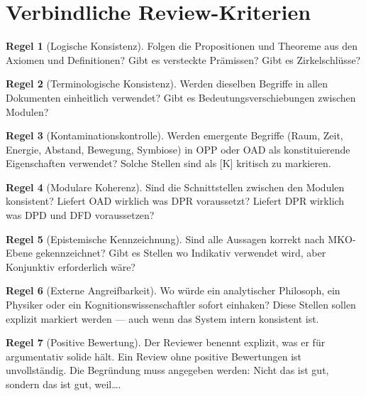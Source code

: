 \documentclass[11pt,a4paper]{article}
\theoremstyle{definition}
\newtheorem{regel}{Regel}[section]
\begin{document}
\section{Verbindliche Review-Kriterien}

\begin{regel}[Logische Konsistenz]
Folgen die Propositionen und Theoreme aus den Axiomen und Definitionen? Gibt es
versteckte Pr\"{a}missen? Gibt es Zirkelschl\"{u}sse?
\end{regel}

\begin{regel}[Terminologische Konsistenz]
Werden dieselben Begriffe in allen Dokumenten einheitlich verwendet? Gibt es
Bedeutungsverschiebungen zwischen Modulen?
\end{regel}

\begin{regel}[Kontaminationskontrolle]
Werden emergente Begriffe (Raum, Zeit, Energie, Abstand, Bewegung, Symbiose) in
OPP oder OAD als konstituierende Eigenschaften verwendet? Solche Stellen sind
als [K] kritisch zu markieren.
\end{regel}

\begin{regel}[Modulare Koherenz]
Sind die Schnittstellen zwischen den Modulen konsistent? Liefert OAD wirklich was
DPR voraussetzt? Liefert DPR wirklich was DPD und DFD voraussetzen?
\end{regel}

\begin{regel}[Epistemische Kennzeichnung]
Sind alle Aussagen korrekt nach MKO-Ebene gekennzeichnet? Gibt es Stellen wo
Indikativ verwendet wird, aber Konjunktiv erforderlich w\"{a}re?
\end{regel}

\begin{regel}[Externe Angreifbarkeit]
Wo w\"{u}rde ein analytischer Philosoph, ein Physiker oder ein Kognitionswissenschaftler
sofort einhaken? Diese Stellen sollen explizit markiert werden --- auch wenn das
System intern konsistent ist.
\end{regel}

\begin{regel}[Positive Bewertung]
Der Reviewer benennt explizit, was er f\"{u}r argumentativ solide h\"{a}lt. Ein Review
ohne positive Bewertungen ist unvollst\"{a}ndig. Die Begr\"{u}ndung muss angegeben werden:
Nicht \glqq{}das ist gut\grqq{}, sondern \glqq{}das ist gut, weil\ldots\grqq{}.
\end{regel}
\end{document}
